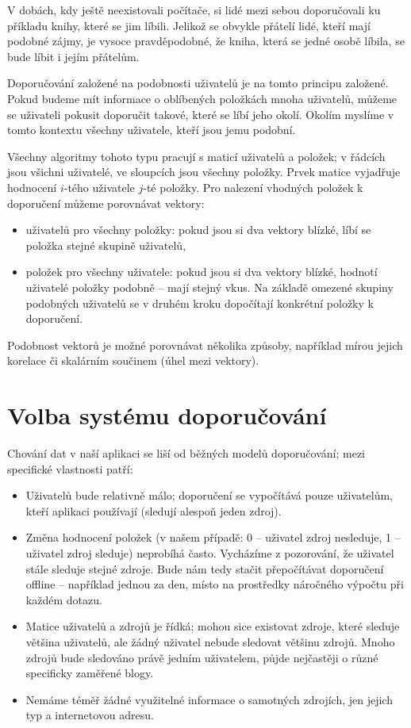 V dobách, kdy ještě neexistovali počítače, si lidé mezi sebou doporučovali ku příkladu knihy, které se jim líbili.
Jelikož se obvykle přátelí lidé, kteří mají podobné zájmy, je vysoce pravděpodobné, že kniha, která se jedné osobě líbila, se bude líbit i jejím přátelům.

Doporučování založené na podobnosti uživatelů je na tomto principu založené.
Pokud budeme mít informace o oblíbených položkách mnoha uživatelů, můžeme se uživateli pokusit doporučit takové, které se líbí jeho okolí.
Okolím myslíme v tomto kontextu všechny uživatele, kteří jsou jemu podobní.

Všechny algoritmy tohoto typu pracují s maticí uživatelů a položek; v řádcích jsou všichni uživatelé, ve sloupcích jsou všechny položky.
Prvek matice vyjadřuje hodnocení $i$-tého uživatele $j$-té položky.
Pro nalezení vhodných položek k doporučení můžeme porovnávat vektory:
\begin{itemize}
    \item uživatelů pro všechny položky: pokud jsou si dva vektory blízké, líbí se položka stejné skupině uživatelů,
    \item položek pro všechny uživatele: pokud jsou si dva vektory blízké, hodnotí uživatelé položky podobně -- mají stejný vkus.
        Na základě omezené skupiny podobných uživatelů se v druhém kroku dopočítají konkrétní položky k doporučení.
\end{itemize}

Podobnost vektorů je možné porovnávat několika způsoby, například mírou jejich korelace či skalárním součinem (úhel mezi vektory).

\section{Volba systému doporučování}

Chování dat v naší aplikaci se liší od běžných modelů doporučování; mezi specifické vlastnosti patří:

\begin{itemize}
    \item Uživatelů bude relativně málo; doporučení se vypočítává pouze uživatelům, kteří aplikaci používají (sledují alespoň jeden zdroj).
    \item Změna hodnocení položek (v našem případě: 0 -- uživatel zdroj nesleduje, 1 -- uživatel zdroj sleduje) neprobíhá často.
        Vycházíme z pozorování, že uživatel stále sleduje stejné zdroje.
        Bude nám tedy stačit přepočítávat doporučení offline -- například jednou za den, místo na prostředky náročného výpočtu při každém dotazu.
    \item Matice uživatelů a zdrojů je řídká; mohou sice existovat zdroje, které sleduje většina uživatelů, ale žádný uživatel nebude sledovat většinu zdrojů.
        Mnoho zdrojů bude sledováno právě jedním uživatelem, půjde nejčastěji o různé specificky zaměřené blogy.
    \item Nemáme téměř žádné využitelné informace o samotných zdrojích, jen jejich typ a internetovou adresu.
\end{itemize}


